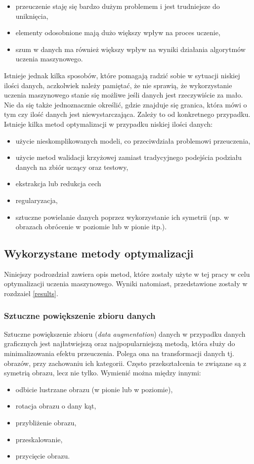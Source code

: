 \begin{itemize}
\item przeuczenie staję się bardzo dużym problemem i jest trudniejsze do uniknięcia,
\item elementy odosobnione mają dużo większy wpływ na proces uczenie,
\item szum w danych ma również większy wpływ na wyniki działania algorytmów uczenia maszynowego.
\end{itemize}
Istnieje jednak kilka sposobów, które pomagają radzić sobie w sytuacji niskiej ilości danych, aczkolwiek należy pamiętać, że nie sprawią, że wykorzystanie uczenia maszynowego stanie się możliwe jeśli danych jest rzeczywiście za mało. Nie da się także jednoznacznie określić, gdzie znajduje się granica, która mówi o tym czy ilość danych jest niewystarczająca. Zależy to od konkretnego przypadku. Istnieje kilka metod optymalizacji w przypadku niskiej ilości danych:
\begin{itemize}
\item użycie nieskomplikowanych modeli, co przeciwdziała problemowi przeuczenia,
\item użycie metod walidacji krzyżowej zamiast tradycyjnego podejścia podziału danych na zbiór uczący oraz testowy,
\item ekstrakcja lub redukcja cech
\item regularyzacja,
\item sztuczne powielanie danych poprzez wykorzystanie ich symetrii (np. w obrazach obrócenie w poziomie lub w pionie itp.).
\end{itemize}


\subsection{Wykorzystane metody optymalizacji}
Niniejszy podrozdział zawiera opis metod, które zostały użyte w tej pracy w celu optymalizacji uczenia maszynowego. Wyniki 
natomiast, przedstawione zostały w rozdzaiel \ref{results}.
\subsubsection{Sztuczne powiększenie zbioru danych}
Sztuczne powiększenie zbioru (\textit{data augmentation}) danych w przypadku danych graficznych jest najłatwiejszą oraz najpopularniejszą metodą, która służy do minimalizowania efektu przeuczenia\cite{dataaugment}. Polega ona na transformacji danych tj. obrazów, przy zachowaniu ich kategorii. Często przekształcenia te związane są z symetrią obrazu, lecz nie tylko. Wymienić można między innymi:
\begin{itemize}
\item odbicie lustrzane obrazu (w pionie lub w poziomie),
\item rotacja obrazu o dany kąt,
\item przybliżenie obrazu,
\item przeskalowanie,
\item przycięcie obrazu.
\end{itemize}

